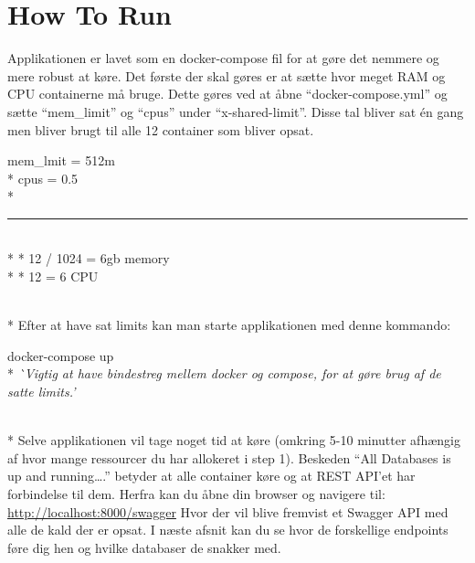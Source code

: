 \section{How To Run}
Applikationen er lavet som en docker-compose fil for at gøre det nemmere og mere robust at køre. Det første der skal gøres er at sætte hvor meget RAM og CPU containerne må bruge. Dette gøres ved at åbne “docker-compose.yml” og sætte “mem\_limit” og “cpus” under “x-shared-limit”. Disse tal bliver sat én gang men bliver brugt til alle 12 container som bliver opsat.
\begin{tcolorbox}
    \text mem\_lmit = 512m \\*
    \text cpus = 0.5 \\*
    \noindent\rule{5cm}{0.4pt} \\*
     * 12 / 1024 = 6gb memory \\*
     * 12 = 6 CPU
\end{tcolorbox}\leavevmode \\*
Efter at have sat limits kan man starte applikationen med denne kommando:
\begin{tcolorbox}
    \text docker-compose up \\*
    \textit{^^ Vigtig at have bindestreg mellem docker og compose, for at gøre brug af de satte limits.'}
\end{tcolorbox}\leavevmode \\*
Selve applikationen vil tage noget tid at køre (omkring 5-10 minutter afhængig af hvor mange ressourcer du har allokeret i step 1). Beskeden “All Databases is up and running….” betyder at alle container køre og at REST API’et har forbindelse til dem. Herfra kan du åbne din browser og navigere til: \url{http://localhost:8000/swagger} Hvor der vil blive fremvist et Swagger API med alle de kald der er opsat. I næste afsnit  kan du se hvor de forskellige endpoints føre dig hen og hvilke databaser de snakker med.